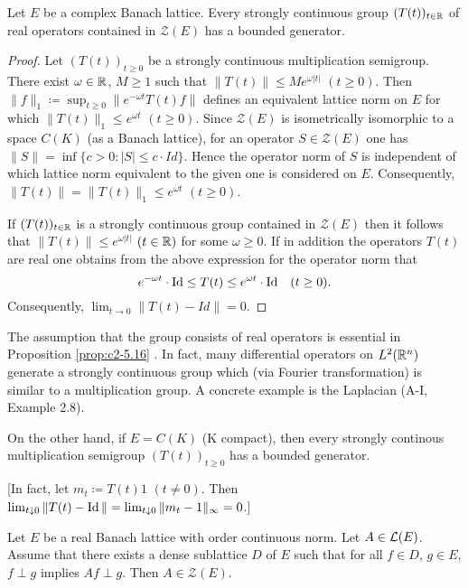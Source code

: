 \begin{proposition}\label{prop:c2-5.16}
Let $E$ be a complex Banach lattice.
Every strongly continuous group $(T(t))_{t \in \mathbb{R}}$ of real operators contained in $\mathcal{Z}(E)$ has a bounded generator.
\end{proposition}
\begin{proof}
Let $(T(t))_{t \geq 0}$ be a strongly continuous multiplication semigroup.
There exist $\omega \in \mathbb{R}$, $M \geq 1$ such that $\|T(t)\| \leq Me^{\omega|t|}$ $(t \geq 0)$.
Then $\|f\|_1 \coloneqq \sup_{t \geq 0}\|e^{-\omega t}T(t)f\|$ defines an equivalent lattice norm on $E$ for which $\|T(t)\|_1 \leq e^{\omega t}$ $(t \geq 0)$.
Since $\mathcal{Z}(E)$ is isometrically isomorphic to a space $C(K)$ (as a Banach lattice), for an operator $S \in \mathcal{Z}(E)$ one has $\|S\| = \inf\{c > 0 : |S| \leq c \cdot Id\}$.
Hence the operator norm of $S$ is independent of which lattice norm equivalent to the given one is considered on $E$.
Consequently, $\|T(t)\| = \|T(t)\|_1 \leq e^{\omega t}$ $(t \geq 0)$.

If $(T(t))_{t \in \mathbb{R}}$ is a strongly continuous group contained in $\mathcal{Z}(E)$ then it follows that $\|T(t)\| \leq e^{\omega|t|}$ $(t \in \mathbb{R})$ for some $\omega \geq 0$. 
If in addition the operators $T(t)$ are real one obtains from the above expression for the operator norm that 
\[
e^{- \omega t} \cdot \operatorname{Id} \leq T(t) \leq e^{\omega t} \cdot \operatorname{Id} \quad (t \geq 0) .
\] 
Consequently, $\lim_{t \to 0}\|T(t) - Id\| = 0$.
\end{proof}

The assumption that the group consists of real operators is essential in Proposition \ref{prop:c2-5.16}  .
In fact, many differential operators on $L^2(\mathbb{R}^n)$ generate a strongly continuous group which (via Fourier transformation) is similar to a multiplication group.
A concrete example is the Laplacian (A-I, Example 2.8).

On the other hand, if $E = C(K)$ (K compact), then every strongly continous multiplication semigroup $(T(t))_{t \geq 0}$ has a bounded generator.

[In fact, let $m_t \coloneqq T(t)1$ $(t \neq 0)$.
Then $\lim_{t \downarrow 0}\|T(t) - \operatorname{Id}\| =    \lim_{t \downarrow 0}\|m_t - 1\|_{\infty} = 0$.]

\begin{lemma}\label{lem:c2-5.17}
Let $E$ be a real Banach lattice with order continuous norm.
Let $A \in \mathcal{L}(E)$.
Assume that there exists a dense sublattice $D$ of $E$ such that for all $f \in D$, $g \in E$, $f \perp g$ implies $Af \perp g$.
Then $A \in \mathcal{Z}(E)$.
\end{lemma}

